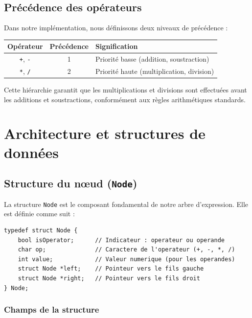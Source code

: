 \documentclass[12pt,a4paper]{article}
\begin{document}
\subsection{Précédence des opérateurs}

Dans notre implémentation, nous définissons deux niveaux de précédence :

\begin{center}
\begin{tabular}{|c|c|l|}
\hline
\textbf{Opérateur} & \textbf{Précédence} & \textbf{Signification} \\
\hline
\texttt{+}, \texttt{-} & 1 & Priorité basse (addition, soustraction) \\
\hline
\texttt{*}, \texttt{/} & 2 & Priorité haute (multiplication, division) \\
\hline
\end{tabular}
\end{center}

Cette hiérarchie garantit que les multiplications et divisions sont effectuées avant les additions et soustractions, conformément aux règles arithmétiques standards.

\section{Architecture et structures de données}

\subsection{Structure du nœud (\texttt{Node})}

La structure \texttt{Node} est le composant fondamental de notre arbre d'expression. Elle est définie comme suit :

\begin{lstlisting}[caption={Structure Node dans node.h}]
typedef struct Node {
    bool isOperator;      // Indicateur : operateur ou operande
    char op;              // Caractere de l'operateur (+, -, *, /)
    int value;            // Valeur numerique (pour les operandes)
    struct Node *left;    // Pointeur vers le fils gauche
    struct Node *right;   // Pointeur vers le fils droit
} Node;
\end{lstlisting}

\subsubsection{Champs de la structure}
\end{document}
